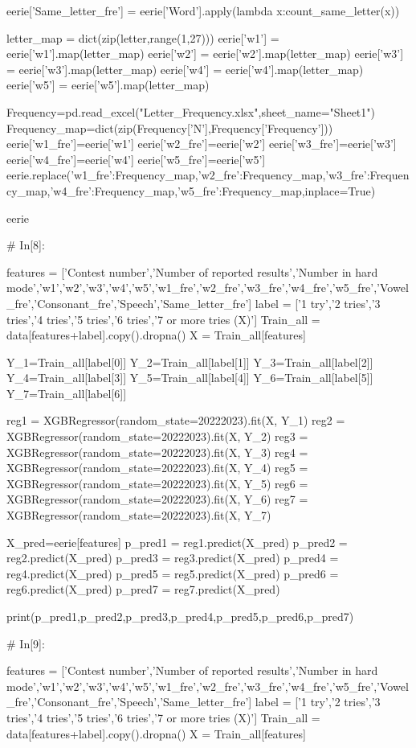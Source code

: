 \documentclass{MathModeling}
\begin{document}
\begin{python}
eerie['Same_letter_fre'] = eerie['Word'].apply(lambda x:count_same_letter(x))

letter_map = dict(zip(letter,range(1,27)))
eerie['w1'] = eerie['w1'].map(letter_map)
eerie['w2'] = eerie['w2'].map(letter_map)
eerie['w3'] = eerie['w3'].map(letter_map)
eerie['w4'] = eerie['w4'].map(letter_map)
eerie['w5'] = eerie['w5'].map(letter_map)

Frequency=pd.read_excel("Letter_Frequency.xlsx",sheet_name="Sheet1")
Frequency_map=dict(zip(Frequency['N'],Frequency['Frequency']))
eerie['w1_fre']=eerie['w1']
eerie['w2_fre']=eerie['w2']
eerie['w3_fre']=eerie['w3']
eerie['w4_fre']=eerie['w4']
eerie['w5_fre']=eerie['w5']
eerie.replace({'w1_fre':Frequency_map,'w2_fre':Frequency_map,'w3_fre':Frequency_map,'w4_fre':Frequency_map,'w5_fre':Frequency_map},inplace=True)

eerie


# In[8]:


features = ['Contest number','Number of reported results','Number in hard mode','w1','w2','w3','w4','w5','w1_fre','w2_fre','w3_fre','w4_fre','w5_fre','Vowel_fre','Consonant_fre','Speech','Same_letter_fre']
label = ['1 try','2 tries','3 tries','4 tries','5 tries','6 tries','7 or more tries (X)']
Train_all = data[features+label].copy().dropna()
X = Train_all[features]

Y_1=Train_all[label[0]]
Y_2=Train_all[label[1]]
Y_3=Train_all[label[2]]
Y_4=Train_all[label[3]]
Y_5=Train_all[label[4]]
Y_6=Train_all[label[5]]
Y_7=Train_all[label[6]]

reg1 = XGBRegressor(random_state=20222023).fit(X, Y_1)
reg2 = XGBRegressor(random_state=20222023).fit(X, Y_2)
reg3 = XGBRegressor(random_state=20222023).fit(X, Y_3)
reg4 = XGBRegressor(random_state=20222023).fit(X, Y_4)
reg5 = XGBRegressor(random_state=20222023).fit(X, Y_5)
reg6 = XGBRegressor(random_state=20222023).fit(X, Y_6)
reg7 = XGBRegressor(random_state=20222023).fit(X, Y_7)

X_pred=eerie[features]
p_pred1 = reg1.predict(X_pred)
p_pred2 = reg2.predict(X_pred)
p_pred3 = reg3.predict(X_pred)
p_pred4 = reg4.predict(X_pred)
p_pred5 = reg5.predict(X_pred)
p_pred6 = reg6.predict(X_pred)
p_pred7 = reg7.predict(X_pred)

print(p_pred1,p_pred2,p_pred3,p_pred4,p_pred5,p_pred6,p_pred7)


# In[9]:


features = ['Contest number','Number of reported results','Number in hard mode','w1','w2','w3','w4','w5','w1_fre','w2_fre','w3_fre','w4_fre','w5_fre','Vowel_fre','Consonant_fre','Speech','Same_letter_fre']
label = ['1 try','2 tries','3 tries','4 tries','5 tries','6 tries','7 or more tries (X)']
Train_all = data[features+label].copy().dropna()
X = Train_all[features]


\end{python}
\end{document}
